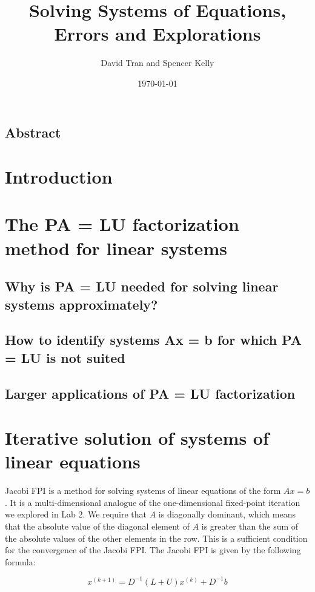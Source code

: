 \documentclass[11pt]{article}
\title{Solving Systems of Equations, Errors and Explorations}
\author{David Tran and Spencer Kelly}
\date{\today}
\begin{document}
\maketitle

\subsection*{Abstract}

\section{Introduction}

\section{The PA = LU factorization method for linear systems}

\subsection{Why is PA = LU needed for solving linear systems approximately?}

\subsection{How to identify systems Ax = b for which PA = LU is not suited}

\subsection{Larger applications of PA = LU factorization}

\section{Iterative solution of systems of linear equations}

Jacobi FPI is a method for solving systems of linear equations of the form $Ax = b$. It is a multi-dimensional analogue of the one-dimensional fixed-point iteration we explored in Lab 2. We require that $A$ is diagonally dominant, which means that the absolute value of the diagonal element of $A$ is greater than the sum of the absolute values of the other elements in the row. This is a sufficient condition for the convergence of the Jacobi FPI. The Jacobi FPI is given by the following formula:

\begin{equation}
x^{(k+1)} = D^{-1}(L+U)x^{(k)} + D^{-1}b
\end{equation}
\end{document}
